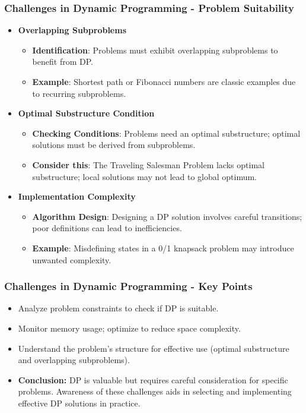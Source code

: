 \documentclass[aspectratio=169]{beamer}
\begin{document}
\begin{frame}[fragile]
    \frametitle{Challenges in Dynamic Programming - Problem Suitability}
    \begin{itemize}
        \item \textbf{Overlapping Subproblems}
        \begin{itemize}
            \item \textbf{Identification}: Problems must exhibit overlapping subproblems to benefit from DP.
            \item \textbf{Example}: Shortest path or Fibonacci numbers are classic examples due to recurring subproblems.
        \end{itemize}
        
        \item \textbf{Optimal Substructure Condition}
        \begin{itemize}
            \item \textbf{Checking Conditions}: Problems need an optimal substructure; optimal solutions must be derived from subproblems.
            \item \textbf{Consider this}: The Traveling Salesman Problem lacks optimal substructure; local solutions may not lead to global optimum.
        \end{itemize}

        \item \textbf{Implementation Complexity}
        \begin{itemize}
            \item \textbf{Algorithm Design}: Designing a DP solution involves careful transitions; poor definitions can lead to inefficiencies.
            \item \textbf{Example}: Misdefining states in a 0/1 knapsack problem may introduce unwanted complexity.
        \end{itemize}
    \end{itemize}
\end{frame}

\begin{frame}[fragile]
    \frametitle{Challenges in Dynamic Programming - Key Points}
    \begin{itemize}
        \item Analyze problem constraints to check if DP is suitable.
        \item Monitor memory usage; optimize to reduce space complexity.
        \item Understand the problem's structure for effective use (optimal substructure and overlapping subproblems).
        
        \item \textbf{Conclusion:} 
        DP is valuable but requires careful consideration for specific problems. Awareness of these challenges aids in selecting and implementing effective DP solutions in practice.
    \end{itemize}
\end{frame}
\end{document}
